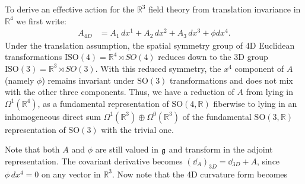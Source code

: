 	To derive an effective action for the $\mathbb R^3$ field theory from translation invariance in $\mathbb R^4$ we first write:
	\begin{equation*}
		\begin{aligned}
			A_{4D} &= A_1\, dx^1 + A_2\, dx^2 + A_3\, dx^3 + \phi dx^4.
		\end{aligned}
	\end{equation*}
	Under the translation assumption, the spatial symmetry group of 4D Euclidean transformations $\mathrm{ISO}(4) = \mathbb R^4 \rtimes SO(4)$ reduces down to the 3D group $\mathrm{ISO}(3) = \mathbb R^3 \rtimes SO(3)$. With this reduced symmetry, the $x^4$ component of $A$ (namely $\phi$) remains invariant under $\mathrm{SO}(3)$ transformations and does not mix with the other three components. Thus, we have a reduction of $A$ from lying in $\Omega^1(\mathbb R^4)$, as a fundamental representation of $\mathrm{SO}(4, \mathbb R)$ fiberwise to lying in an inhomogeneous direct sum $\Omega^1(\mathbb R^3) \oplus \Omega^0(\mathbb R^3)$ of the fundamental $\mathrm{SO}(3, \mathbb R)$ representation of $\mathrm{SO}(3)$ with the trivial one.
	
	Note that both $A$ and $\phi$ are still valued in $\frak g$ and transform in the adjoint representation. The covariant derivative becomes $(\dd_A)_{3D} = \dd_{3D} + A$, since $\phi\, dx^4 = 0$ on any vector in $\mathbb R^3$. Now note that the 4D curvature form becomes
%
	
	
	
